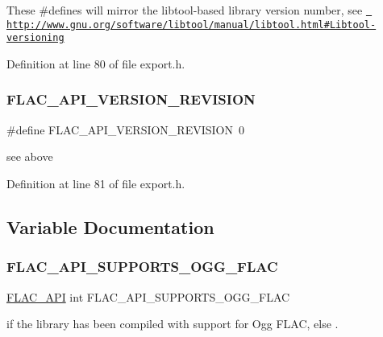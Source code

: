 These \#defines will mirror the libtool-\/based library version number, see \href{http://www.gnu.org/software/libtool/manual/libtool.html\#Libtool-versioning}{\texttt{ http\+://www.\+gnu.\+org/software/libtool/manual/libtool.\+html\#\+Libtool-\/versioning}} 

Definition at line 80 of file export.\+h.

\mbox{\label{group__flac__export_ga811641dd9f8c542d9260240e7fbe8e93}} 
\subsubsection{\texorpdfstring{FLAC\_API\_VERSION\_REVISION}{FLAC\_API\_VERSION\_REVISION}}
{\footnotesize\ttfamily \#define F\+L\+A\+C\+\_\+\+A\+P\+I\+\_\+\+V\+E\+R\+S\+I\+O\+N\+\_\+\+R\+E\+V\+I\+S\+I\+ON~0}

see above 

Definition at line 81 of file export.\+h.



\subsection{Variable Documentation}
\mbox{\label{group__flac__export_gaf762876dd61fbf2da1bef49762900533}} 
\subsubsection{\texorpdfstring{FLAC\_API\_SUPPORTS\_OGG\_FLAC}{FLAC\_API\_SUPPORTS\_OGG\_FLAC}}
{\footnotesize\ttfamily \mbox{\hyperlink{group__flac__export_ga56ca07df8a23310707732b1c0007d6f5}{F\+L\+A\+C\+\_\+\+A\+PI}} int F\+L\+A\+C\+\_\+\+A\+P\+I\+\_\+\+S\+U\+P\+P\+O\+R\+T\+S\+\_\+\+O\+G\+G\+\_\+\+F\+L\+AC}

{} if the library has been compiled with support for Ogg F\+L\+AC, else {}. 